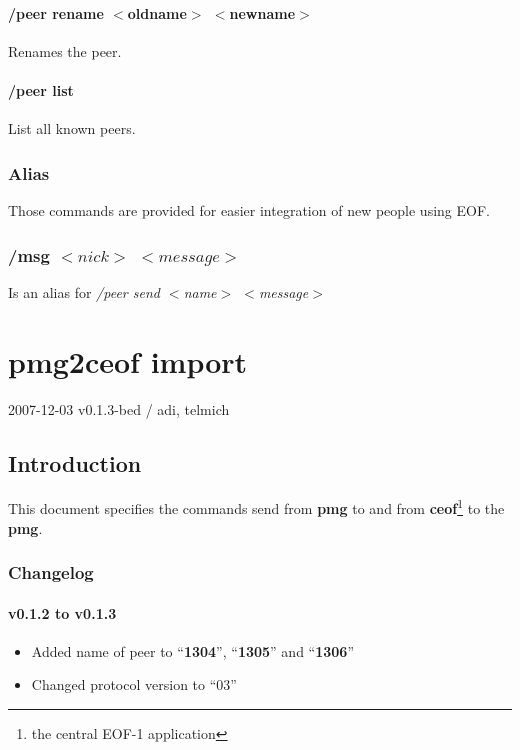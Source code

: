 \documentclass[12pt,a4paper]{book}
\begin{document}
\subsubsection{/peer rename $<$oldname$>$ $<$newname$>$}
Renames the peer.
\subsubsection{/peer list}
List all known peers.

\subsection{Alias}
Those commands are provided for easier integration of
new people using EOF.
\subsection{/msg $<nick>$ $<message>$}
Is an alias for \textit{/peer send $<$name$>$ $<$message$>$}
\chapter{pmg2ceof import}

2007-12-03 v0.1.3-bed / adi, telmich

\section{Introduction}
This document specifies the commands send from \textbf{pmg} to and from
\textbf{ceof}\footnote{the central EOF-1 application} to the \textbf{pmg}.

\subsection{Changelog}
\subsubsection{v0.1.2 to v0.1.3}
\begin{itemize}
\item Added name of peer to "`\textbf{1304}"', "`\textbf{1305}"' and "`\textbf{1306}"'
\item Changed protocol version to "`03"'
\end{itemize}
\end{document}
